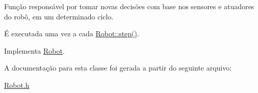 Função responsável por tomar novas decisões com base nos sensores e atuadores do robô, em um determinado ciclo. 

É executada uma vez a cada \hyperlink{classRobot_aa50d73cd1109a70133af442674ed3a1a}{Robot\-::step()}. 

Implementa \hyperlink{classRobot_a75cfdd8e35e007abe24ffae66a8ecf1d}{Robot}.



A documentação para esta classe foi gerada a partir do seguinte arquivo\-:\begin{DoxyCompactItemize}
\item 
\hyperlink{Robot_8h}{Robot.\-h}\end{DoxyCompactItemize}

